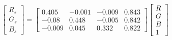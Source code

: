 \begin{equation}
\begin{bmatrix}
  R_s \\ G_s \\ B_s 
\end{bmatrix}=
\left[\begin{matrix}0.405 & -0.001 & -0.009 & 0.843\\ 
-0.08 & 0.448 & -0.005 & 0.842\\ 
-0.009 & 0.045 & 0.332 & 0.822\end{matrix}\right]
\begin{bmatrix}
  R \\ G \\ B \\ 1 
\end{bmatrix}
\end{equation}
